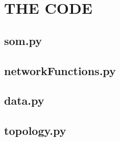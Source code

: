 \appendix
%
%

\chapter{THE CODE}

\label{append:somcode}
\section{som.py}

\section{networkFunctions.py}

\section{data.py}

\section{topology.py}


